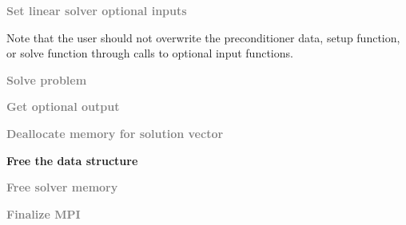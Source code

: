 \begin{Steps}
\item
  \textcolor{gray}{\bf Set linear solver optional inputs}

  Note that the user should not overwrite the preconditioner data, setup function,
  or solve function through calls to {\kinspgmr} optional input functions.

\item
  \textcolor{gray}{\bf Solve problem}

\item
  \textcolor{gray}{\bf Get optional output}

\item
  \textcolor{gray}{\bf Deallocate memory for solution vector}

\item \label{i:bbdpre_free}
  {\bf Free the {\kinbbdpre} data structure}


\item
  \textcolor{gray}{\bf Free solver memory}
  
\item 
  \textcolor{gray}{\bf Finalize MPI}

\end{Steps}

